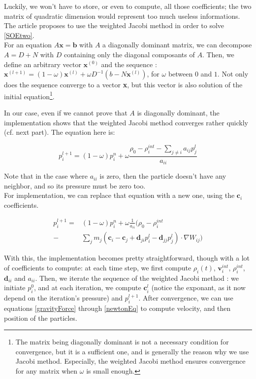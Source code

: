 \documentclass[acmtog, authorversion]{acmart}
\begin{document}
Luckily, we won't have to store, or even to compute, all those coefficients; the two matrix of quadratic dimension would represent too much useless informations.
The article proposes to use the weighted Jacobi method in order to solve \eqref{SOEtwo}.\\
For an equation $A\textbf{x} = \textbf{b}$ with $A$ a diagonally dominant matrix, we can decompose $A = D + N$ with $D$ containing only the diagonal composants of $A$.
Then, we define an arbitrary vector $\textbf{x}^{(0)}$ and the sequence : $\textbf{x}^{(l+1)} = (1 - \omega) \textbf{x}^{(l)} + \omega D^{-1}\left( b - N \textbf{x}^{(l)} \right)$, for $\omega$ between $0$ and $1$.
Not only does the sequence converge to a vector \textbf{x}, but this vector is also solution of the initial equation\footnote{The matrix being diagonally dominant is not a necessary condition for convergence, but it is a sufficient one, and is generally the reason why we use Jacobi method. Especially, the weighted Jacobi method ensures convergence for any matrix when $\omega$ is small enough.}.

In our case, even if we cannot prove that $A$ is diagonally dominant, the implementation shows that the weighted Jacobi method converges rather quickly (cf. next part). The equation here is:

\begin{equation}
  p_i^{l+1} = (1 - \omega) p_i^{n} + \omega \frac{\rho_0 - \rho_i^{int} - \sum_{j \neq i}a_{ij}p_j^l}{a_{ii}}
\end{equation} 

Note that in the case where $a_{ii}$ is zero, then the particle doesn't have any neighbor, and so its pressure must be zero too.\\
For implementation, we can replace that equation with a new one, using the $\textbf{c}_i$ coefficients.

\begin{equation}
  \begin{aligned}
    p_i^{l+1} = & (1 - \omega) p_i^{n} + \omega \frac{1}{a_{ii}}\Bigg( \rho_0 - \rho_i^{int} \\
     - & \sum_{j} m_j \left( \textbf{c}_i - \textbf{c}_j + \textbf{d}_{ji}p_i^l - \textbf{d}_{jj}p_j^l \right)\cdot \nabla W_{ij} \Bigg)
  \end{aligned}
\end{equation}

With this, the implementation becomes pretty straightforward, though with a lot of coefficients to compute: at each time step, we first compute $\rho_i(t)$, $\textbf{v}_{i}^{int}$, $\rho_i^{int}$, $\textbf{d}_{ii}$ and $a_{ii}$.
Then, we iterate the sequence of the weighted Jacobi method : we initiate $p_i^0$, and at each iteration, we compute $\textbf{c}_{i}^{l}$ (notice the exponant, as it now depend on the iteration's pressure) and $p_i^{l+1}$.
After convergence, we can use equations \eqref{gravityForce} through \eqref{newtonEq} to compute velocity, and then position of the particles.
\end{document}
